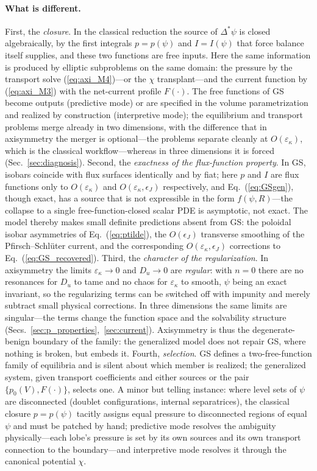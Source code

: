 \documentclass[english]{article}
\begin{document}
\paragraph{What is different.}
First, the \emph{closure}. In the classical reduction the source of $\Delta^*\psi$ is closed
algebraically, by the first integrals $p=p(\psi)$ and $I=I(\psi)$ that force balance itself
supplies, and these two functions are free inputs. Here the same information is produced by
elliptic subproblems on the same domain: the pressure by the transport solve
(\ref{eq:axi_M4})---or the $\chi$ transplant---and the current function by (\ref{eq:axi_M3}) with
the net-current profile $F(\cdot)$. The free functions of GS become outputs (predictive mode) or
are specified in the volume parametrization and realized by construction (interpretive mode); the
equilibrium and transport problems merge already in two dimensions, with the difference that in
axisymmetry the merger is optional---the problems separate cleanly at
$O(\varepsilon_\kappa)$, which is the classical workflow---whereas in three dimensions it is
forced (Sec.~\ref{sec:diagnosis}). Second, the \emph{exactness of the flux-function property}. In
GS, isobars coincide with flux surfaces identically and by fiat; here $p$ and $I$ are flux
functions only to $O(\varepsilon_\kappa)$ and $O(\varepsilon_\kappa,\epsilon_J)$ respectively, and
Eq.~(\ref{eq:GSgen}), though exact, has a source that is not expressible in the form
$f(\psi,R)$---the collapse to a single free-function-closed scalar PDE is asymptotic, not exact.
The model thereby makes small definite predictions absent from GS: the poloidal isobar asymmetries
of Eq.~(\ref{eq:ptilde}), the $O(\epsilon_J)$ transverse smoothing of the Pfirsch--Schl\"uter
current, and the corresponding $O(\varepsilon_\kappa,\epsilon_J)$ corrections to
Eq.~(\ref{eq:GS_recovered}). Third, the \emph{character of the regularization}. In axisymmetry the
limits $\varepsilon_\kappa\rightarrow0$ and $D_u\rightarrow0$ are \emph{regular}: with $n=0$ there
are no resonances for $D_u$ to tame and no chaos for $\varepsilon_\kappa$ to smooth, $\psi$ being
an exact invariant, so the regularizing terms can be switched off with impunity and merely
subtract small physical corrections. In three dimensions the same limits are singular---the terms
change the function space and the solvability structure
(Secs.~\ref{sec:p_properties},~\ref{sec:current}). Axisymmetry is thus the degenerate-benign
boundary of the family: the generalized model does not repair GS, where nothing is broken, but
embeds it. Fourth, \emph{selection}. GS defines a two-free-function family of equilibria and is
silent about which member is realized; the generalized system, given transport coefficients and
either sources or the pair $\{p_0(V),F(\cdot)\}$, selects one. A minor but telling instance: where
level sets of $\psi$ are disconnected (doublet configurations, internal separatrices), the
classical closure $p=p(\psi)$ tacitly assigns equal pressure to disconnected regions of equal
$\psi$ and must be patched by hand; predictive mode resolves the ambiguity physically---each
lobe's pressure is set by its own sources and its own transport connection to the boundary---and
interpretive mode resolves it through the canonical potential $\chi$.
\end{document}
